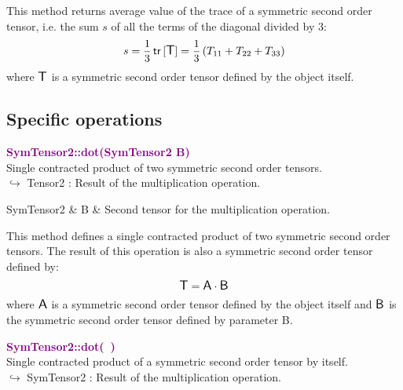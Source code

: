 This method returns average value of the trace of a symmetric second order tensor, i.e. the sum $s$ of all the terms of the diagonal divided by 3:
\begin{equation*}
s = \frac{1}{3} \mbox{\ensuremath{\mathsf{\,tr\,}}}[\mbox{\large\ensuremath{\mathsf{T}}}] =  \frac{1}{3} \left( T_{11}+T_{22}+T_{33} \right)
\end{equation*}
where $\mbox{\large\ensuremath{\mathsf{T}}}$ is a symmetric second order tensor defined by the object itself.

\subsection{Specific operations}

\textcolor{purple}{\textbf{SymTensor2::dot(SymTensor2 B)}}\label{SymTensor2::dot(SymTensor2 B)}\\
Single contracted product of two symmetric second order tensors.\\ \hspace*{10mm}$\hookrightarrow$ Tensor2 : Result of the multiplication operation.

\begin{tcolorbox}[width=\textwidth,myArgs,tabularx={ll|R}]
SymTensor2 & B & Second tensor for the multiplication operation.
\end{tcolorbox}

This method defines a single contracted product of two symmetric second order tensors.
The result of this operation is also a symmetric second order tensor defined by:
\begin{equation*}
\mbox{\large\ensuremath{\mathsf{T}}} = \mbox{\large\ensuremath{\mathsf{A}}} \cdot \mbox{\large\ensuremath{\mathsf{B}}}
\end{equation*}
where $\mbox{\large\ensuremath{\mathsf{A}}}$ is a symmetric second order tensor defined by the object itself and $\mbox{\large\ensuremath{\mathsf{B}}}$ is the symmetric second order tensor defined by parameter B.

\textcolor{purple}{\textbf{SymTensor2::dot(~)}}\label{SymTensor2::dot()}\\
Single contracted product of a symmetric second order tensor by itself.\\ \hspace*{10mm}$\hookrightarrow$ SymTensor2 : Result of the multiplication operation.

